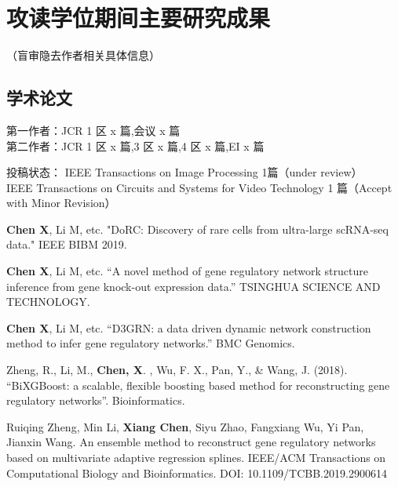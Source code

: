 \section{攻读学位期间主要研究成果} %

\ifblindreview
\noindent
（盲审隐去作者相关具体信息）
\fi
\subsection*{学术论文}

\ifblindreview

\noindent
第一作者：JCR 1 区 x 篇,会议 x 篇 \\{}
第二作者：JCR 1 区 x 篇,3 区 x 篇,4 区 x 篇,EI x 篇 

\noindent
投稿状态： 
IEEE Transactions on Image Processing 1篇（under review）\\{}
IEEE Transactions on Circuits and Systems for Video Technology 1 篇（Accept with Minor Revision）
\else
\begin{enumerate}[label={[\arabic*]}]
\item \textbf{Chen X}, Li M, etc. "DoRC: Discovery of rare cells from ultra-large scRNA-seq data." IEEE BIBM 2019.
\item \textbf{Chen X}, Li M, etc. “A novel method of gene regulatory network structure inference from gene knock-out expression data.” TSINGHUA SCIENCE AND TECHNOLOGY.
\item \textbf{Chen X}, Li M, etc. “D3GRN: a data driven dynamic network construction method to infer gene regulatory networks.” BMC Genomics.
\item Zheng, R., Li, M., \textbf{Chen, X}. , Wu, F. X., Pan, Y., & Wang, J. (2018). “BiXGBoost: a scalable, flexible boosting based method for reconstructing gene regulatory networks”. Bioinformatics.
\item Ruiqing Zheng, Min Li, \textbf{Xiang Chen}, Siyu Zhao, Fangxiang Wu, Yi Pan, Jianxin Wang. An ensemble method to reconstruct gene regulatory networks based on multivariate adaptive regression splines. IEEE/ACM Transactions on Computational Biology and Bioinformatics. DOI: 10.1109/TCBB.2019.2900614

\end{enumerate}
